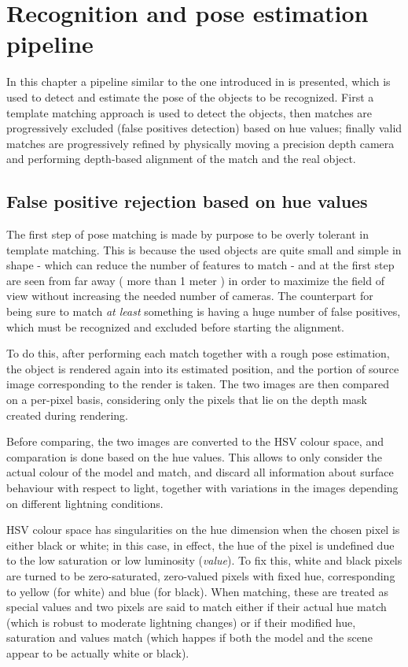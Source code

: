 \section{Recognition and pose estimation pipeline} \label{sec:linemod-pipeline}

In this chapter a pipeline similar to the one introduced in
\cite{linemod-pipeline} is presented, which is used to detect and estimate
the pose of the objects to be recognized. First a template matching approach is
used to detect the objects, then matches are progressively excluded (false
positives detection) based on hue values; finally valid matches are
progressively refined by physically moving a precision depth camera and
performing depth-based alignment of the match and the real object.

\subsection{False positive rejection based on hue values}
The first step of pose matching is made by purpose to be overly tolerant in
template matching. This is because the used objects are quite small and simple
in shape - which can reduce the number of features to match - and at the first
step are seen from far away ( more than 1 meter ) in order to maximize the
field of view without increasing the needed number of cameras. The counterpart
for being sure to match \emph{at least} something is having a huge number of
  false positives, which must be recognized and excluded before starting the
  alignment.


To do this, after performing each match together with a rough pose estimation,
the object is rendered again into its estimated position, and the portion of
source image corresponding to the render is taken. The two images are then
compared on a per-pixel basis, considering only the pixels that lie on the
depth mask created during rendering. 

Before comparing, the two images are converted to the HSV colour space, and
comparation is done based on the hue values. This allows to only consider the
actual colour of the model and match, and discard all information about
surface behaviour with respect to light, together with variations in the images
depending on different lightning conditions.

HSV colour space has singularities on the hue dimension when the chosen pixel is
either black or white; in this case, in effect, the hue of the pixel is
undefined due to the low saturation or low luminosity (\emph{value}). To fix
this, white and black pixels are turned to be zero-saturated, zero-valued
pixels with fixed hue, corresponding to yellow (for white) and blue (for
black). When matching, these are treated as special values and two pixels are
said to match either if their actual hue match (which
is robust to moderate lightning changes) or if their modified hue, saturation
and values match
(which happes if both the model and the scene appear to be actually white or
black). 

